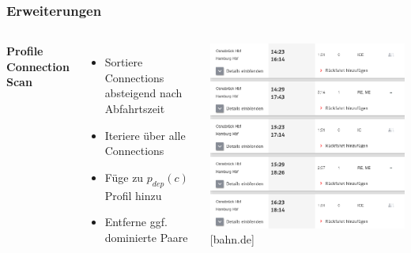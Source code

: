\documentclass[aspectratio=169]{beamer}
\begin{document}
\begin{frame}
\frametitle{Erweiterungen}
\begin{columns}[c] %
	
	\textbf{Profile Connection Scan}
	\begin{itemize}
		\item Sortiere Connections absteigend nach Abfahrtszeit
		\item Iteriere über alle Connections
		\item Füge zu $p_{dep}(c)$ Profil hinzu
		\item Entferne ggf. dominierte Paare
	\end{itemize}
	\includegraphics[scale=0.25]{profiles.png}
	\centering
	\tiny [bahn.de]
	
\end{columns}
\end{frame}
	
\end{document}
